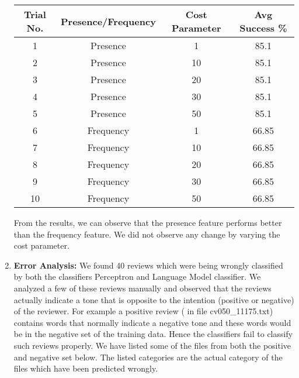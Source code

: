 \documentclass[11pt,a4paper]{article}
\begin{document}
\begin{enumerate}
\begin{center}
				\begin{tabular}{|c|c|c|c|}
				\hline
				{\bf Trial No.} & {\bf Presence/Frequency} & {\bf Cost Parameter }  &{\bf Avg Success \%} \\\hline
				1 &	Presence &1	& 85.1  \\\hline
				2&	Presence &10	& 85.1  \\\hline
				3&	Presence &20	& 85.1 \\\hline
				4 &	Presence &30	& 85.1  \\\hline
				5&	Presence &50	& 85.1  \\\hline
				6&	Frequency &1	& 66.85 \\\hline
				7 &	Frequency &10	& 66.85 \\\hline
				8&	Frequency &20	&66.85 \\\hline
				9&	Frequency &30	&66.85 \\\hline
				10 &	Frequency &50	&66.85 \\\hline
				\end{tabular} 
			\end{center}
From the results, we can observe that the presence feature performs better than the frequency feature. We did not observe any change by varying the cost parameter. 
			\item
			{\bf Error Analysis:} We found 40 reviews which were being wrongly classified by both the classifiers Perceptron and Language Model classifier. We analyzed a few of these reviews manually and observed that the reviews actually indicate a tone that is opposite to the intention (positive or negative) of the reviewer.  For example a positive review ( in file cv050\_11175.txt) contains words that normally indicate a negative tone and these words would be in the negative set of the training data. Hence the classifiers fail to classify such reviews properly. We have listed some of the files from both the positive and negative set below. The listed categories are the actual category of the files which have been predicted wrongly.

\end{enumerate}
\end{document}
